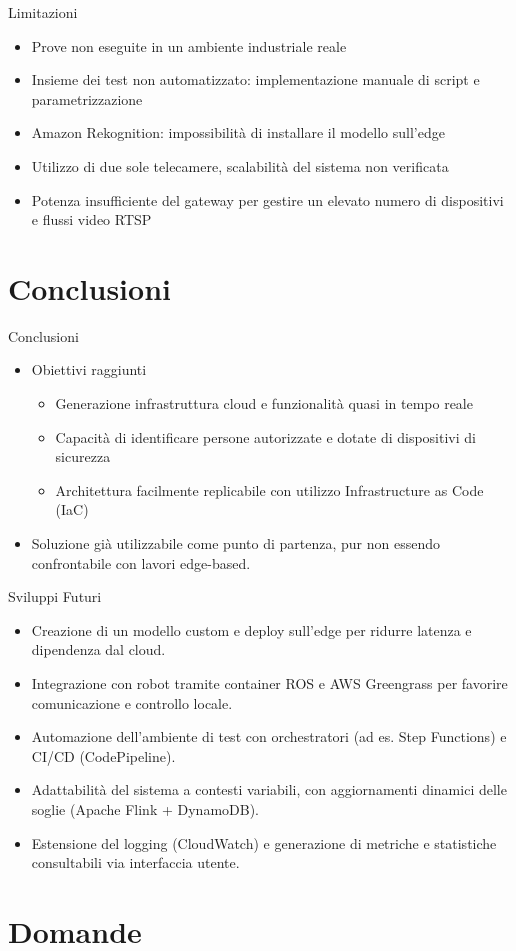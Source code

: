 \documentclass{beamer}
\begin{document}
\begin{frame}{Limitazioni}
\begin{itemize}
    \item Prove non eseguite in un ambiente industriale reale
    \item Insieme dei test non automatizzato: implementazione manuale di script e parametrizzazione
    \item Amazon Rekognition: impossibilità di installare il modello sull'edge
    \item Utilizzo di due sole telecamere, scalabilità del sistema non verificata
    \item Potenza insufficiente del gateway per gestire un elevato numero di dispositivi e flussi video RTSP
\end{itemize}
\end{frame}

\section{Conclusioni}

\begin{frame}{Conclusioni}
\begin{itemize}
    \item Obiettivi raggiunti
	\begin{itemize}
		\item  Generazione infrastruttura cloud e funzionalità quasi in tempo reale 
    	\item Capacità di identificare persone autorizzate e dotate di dispositivi di sicurezza
    \item Architettura facilmente replicabile con utilizzo Infrastructure as Code (IaC)
    \end{itemize}
    \item Soluzione già utilizzabile come punto di partenza, pur non essendo confrontabile con lavori edge-based.
\end{itemize}
\end{frame}

\begin{frame}{Sviluppi Futuri}
\begin{itemize}
    \item Creazione di un modello custom e deploy sull’edge per ridurre latenza e dipendenza dal cloud.
    \item Integrazione con robot tramite container ROS e AWS Greengrass per favorire comunicazione e controllo locale.
    \item Automazione dell’ambiente di test con orchestratori (ad es. Step Functions) e CI/CD (CodePipeline).
    \item Adattabilità del sistema a contesti variabili, con aggiornamenti dinamici delle soglie (Apache Flink + DynamoDB).
    \item Estensione del logging (CloudWatch) e generazione di metriche e statistiche consultabili via interfaccia utente.
\end{itemize}
\end{frame}


\section*{Domande}

\backmatter
\end{document}
